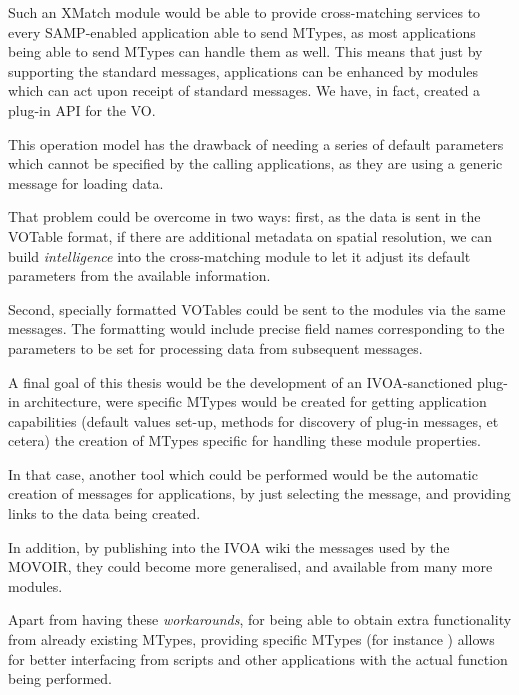 			Such an XMatch module would be able to provide
			cross-matching services to every SAMP-enabled
			application able to send 
			MTypes, as most applications being able to send
			 MTypes can handle them as
			well. This means that just by supporting the
			standard messages, applications can be enhanced by
			modules which can act upon receipt of standard
			messages. We have, in fact, created a plug-in API for
			the VO.
			
			This operation model has the drawback of needing a
			series of default parameters which cannot be specified
			by the calling applications, as they are using a
			generic message for loading data.
			
			That problem could be overcome in two ways:
			first, as the data is sent in the VOTable format,
			if there are additional metadata on spatial resolution,
			we can build \emph{intelligence} into the cross-matching
			module to let it adjust its default parameters from the
			available information.
			
			Second, specially formatted VOTables could be sent to
			the modules via the same 
			messages. The formatting would include precise field
			names corresponding to the parameters to be set for
			processing data from subsequent messages.
			
			A final goal of this thesis would be the development
			of an IVOA-sanctioned plug-in architecture,
			were specific MTypes would be created for getting
			application capabilities (default values set-up,
			methods for discovery of plug-in messages, et cetera)
			the creation of MTypes specific for handling these
			module properties.
			
			In that case, another tool which could be performed
			would be the automatic creation of messages for 
			applications, by just selecting the message, and
			providing links to the data being created.
			
			In addition, by publishing into the IVOA wiki the
			messages used by the MOVOIR, they could become more
			generalised, and available from many more modules.
			
			\invisiblenote
			{Apart from having these \emph{workarounds}, for
			being able to obtain extra functionality from already
			existing MTypes, providing specific MTypes
			(for instance ) allows
			for better interfacing from scripts and other
			applications with the actual function being performed.}
			
